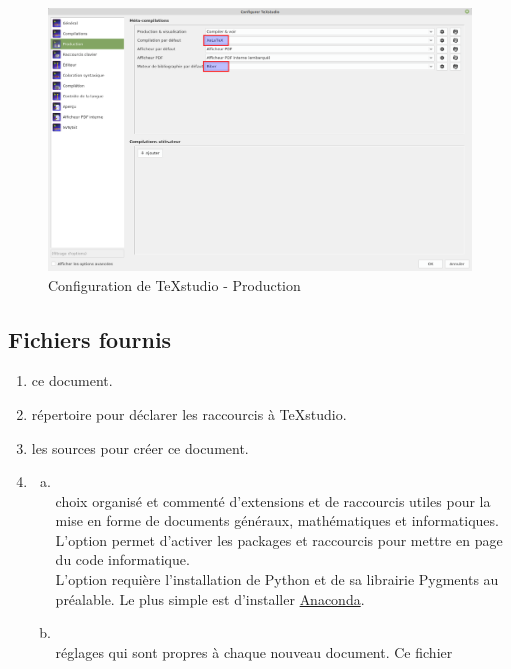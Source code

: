 \begin{figure}[H]
	\centering
	\includegraphics[width=\linewidth]{captures/configurer_TeXstudio_production}
	\caption{Configuration de TeXstudio - Production}
	\label{fig:captureConfigTeXstudioProduction}
\end{figure}





\subsection{Fichiers fournis}

\begin{enumerate}
	\item {} ce document.
	\item {} répertoire pour déclarer les raccourcis à TeXstudio.
	\item {} les sources pour créer ce document.
	\item {}
	\begin{enumerate}[a.]
		\item {} \\
		choix organisé et commenté d'extensions et de raccourcis utiles pour la mise en forme de documents généraux, mathématiques et informatiques. L'option  permet d'activer les packages et raccourcis pour mettre en page du code informatique. \\
		\attention L'option  requière l'installation de Python et de sa librairie Pygments au préalable. Le plus simple est d'installer \href{https://www.anaconda.com/products/individual}{Anaconda}.
		\item {} \\
		réglages qui sont propres à chaque nouveau document. Ce fichier {}
	\end{enumerate}
\end{enumerate}




